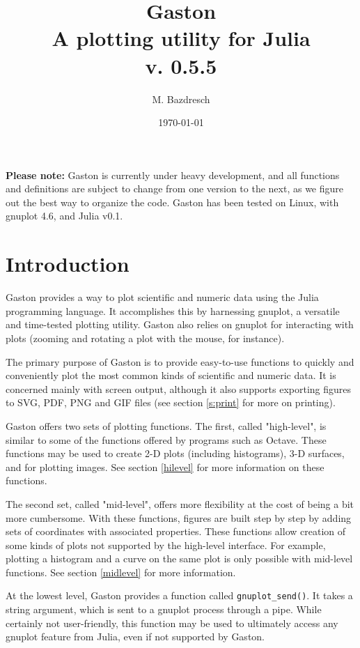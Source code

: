 \documentclass[11pt]{article}
\title{Gaston \\[0.8cm] \large A plotting utility for Julia \\[0.8cm] v. 0.5.5}
\author{M. Bazdresch}
\date{\today}
\newcommand{\cmd}[1]{\texttt{#1}}
\begin{document}
\maketitle

\textbf{Please note:} Gaston is currently under heavy development, and all
functions and definitions are subject to change from one version to the next,
as we figure out the best way to organize the code. Gaston has been tested on
Linux, with gnuplot 4.6, and Julia v0.1.

\tableofcontents

\section{Introduction}

Gaston provides a way to plot scientific and numeric data using the Julia
programming language. It accomplishes this by harnessing gnuplot, a versatile
and time-tested plotting utility. Gaston also relies on gnuplot for interacting
with plots (zooming and rotating a plot with the mouse, for instance).

The primary purpose of Gaston is to provide easy-to-use functions to quickly
and conveniently plot the most common kinds of scientific and numeric data. It
is concerned mainly with screen output, although it also supports exporting
figures to SVG, PDF, PNG and GIF files (see section \ref{s:print} for more on
printing).

Gaston offers two sets of plotting functions. The first, called "high-level",
is similar to some of the functions offered by programs such as Octave. These
functions may be used to create 2-D plots (including histograms), 3-D surfaces,
and for plotting images. See section \ref{hilevel} for more information on
these functions.

The second set, called "mid-level", offers more flexibility at the cost of
being a bit more cumbersome. With these functions, figures are built step by
step by adding sets of coordinates with associated properties. These functions
allow creation of some kinds of plots not supported by the high-level
interface. For example, plotting a histogram and a curve on the same plot is
only possible with mid-level functions. See section \ref{midlevel} for more
information.

At the lowest level, Gaston provides a function called \cmd{gnuplot\_send()}.
It takes a string argument, which is sent to a gnuplot process through a
pipe. While certainly not user-friendly, this function may be used to
ultimately access any gnuplot feature from Julia, even if not supported by
Gaston.
\end{document}
